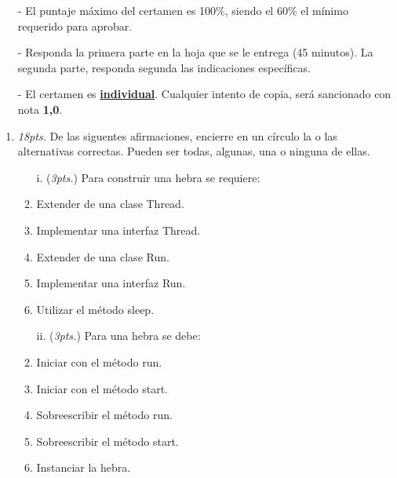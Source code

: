 \documentclass[10pt]{article}
\begin{document}
{\scriptsize
\begin{itemize}
    \item[-] El puntaje m\'aximo del certamen es 100\%, siendo el 60\% el m\'inimo requerido para aprobar.
    \item[-] Responda la primera parte en la hoja que se le entrega (45 minutos). La segunda parte, responda segunda las indicaciones espec\'ificas.
    \item[-] El certamen es \underline{\textbf{individual}}. Cualquier intento de copia, ser\'a sancionado con nota \textbf{1,0}.
\end{itemize}
\vspace*{10pt}

\vspace*{-30pt}

\begin{enumerate}

    \item \emph{18pts.} De las siguentes afirmaciones, encierre en un c\'irculo la o las alternativas correctas. Pueden ser todas, algunas, una o ninguna de ellas.
    \begin{multicols}{2}

    \begin{enumerate}[label=(\alph*)]
        \item[i.] (\emph{3pts.}) Para construir una hebra se requiere:
        \item Extender de una clase Thread.
        \item Implementar una interfaz Thread.
        \item Extender de una clase Run.
        \item Implementar una interfaz Run.
        \item Utilizar el m\'etodo sleep. 
    \end{enumerate}

    \begin{enumerate}[label=(\alph*)]
        \item[ii.] (\emph{3pts.}) Para una hebra se debe:
        \item Iniciar con el m\'etodo run.
        \item Iniciar con el m\'etodo start.
        \item Sobreescribir el m\'etodo run.
        \item Sobreescribir el m\'etodo start.
        \item Instanciar la hebra.
    \end{enumerate}


\end{multicols}
\end{enumerate}}
\end{document}
